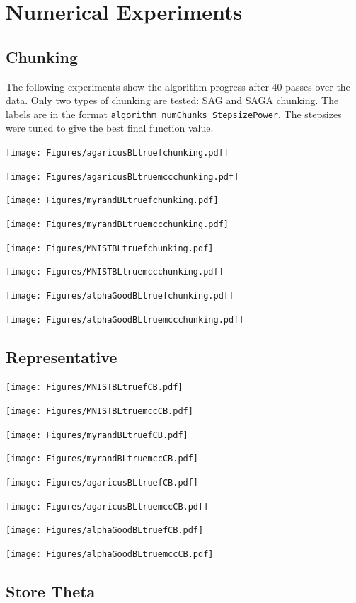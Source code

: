 \documentclass[11pt]{article}
\begin{document}
\section{Numerical Experiments}
\subsection{Chunking}
	The following experiments show the algorithm progress after 40 passes over the data. Only two types of chunking are tested: SAG and SAGA chunking. The labels are in the format \texttt{algorithm numChunks StepsizePower}. The stepsizes were tuned to give the best final function value. 
     
		 \newpage
	 
	\texttt{[image: Figures/agaricusBLtruefchunking.pdf]}

	\texttt{[image: Figures/agaricusBLtruemccchunking.pdf]}

	\texttt{[image: Figures/myrandBLtruefchunking.pdf]}

	\texttt{[image: Figures/myrandBLtruemccchunking.pdf]}

	\texttt{[image: Figures/MNISTBLtruefchunking.pdf]}

	\texttt{[image: Figures/MNISTBLtruemccchunking.pdf]}

	\texttt{[image: Figures/alphaGoodBLtruefchunking.pdf]}

	\texttt{[image: Figures/alphaGoodBLtruemccchunking.pdf]}


	\subsection{Representative}

	\texttt{[image: Figures/MNISTBLtruefCB.pdf]}

	\texttt{[image: Figures/MNISTBLtruemccCB.pdf]}

	\texttt{[image: Figures/myrandBLtruefCB.pdf]}

	\texttt{[image: Figures/myrandBLtruemccCB.pdf]}

	\texttt{[image: Figures/agaricusBLtruefCB.pdf]}

	\texttt{[image: Figures/agaricusBLtruemccCB.pdf]}

	\texttt{[image: Figures/alphaGoodBLtruefCB.pdf]}

	\texttt{[image: Figures/alphaGoodBLtruemccCB.pdf]}
	
	\subsection{Store Theta}
	
\end{document}

